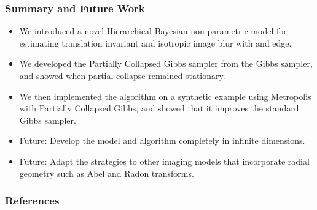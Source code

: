 \documentclass[]{beamer}
\begin{document}
\begin{frame}[t]
  \frametitle{Summary and Future Work}
  {\small
  \begin{itemize}
  \itemsep 1.2em
    \item We introduced a novel \alert{Hierarchical Bayesian non-parametric model} for estimating \alert{translation invariant} and \alert{isotropic} image blur with and edge.
    \item We developed the \alert{Partially Collapsed Gibbs sampler} from the Gibbs sampler, and showed when partial collapse remained \alert{stationary}.
    \item We then implemented the algorithm on a synthetic example using \alert{Metropolis with Partially Collapsed Gibbs}, and showed that it improves the standard Gibbs sampler.
    \item \alert{Future:} Develop the model and algorithm completely in infinite dimensions.
    \item \alert{Future:} Adapt the strategies to other imaging models that incorporate \alert{radial geometry} such as Abel and Radon transforms.
  \end{itemize}
  }
\end{frame}

\begin{frame}
  \frametitle{References}
  
  {\footnotesize
  
  }
\end{frame}
\end{document}
